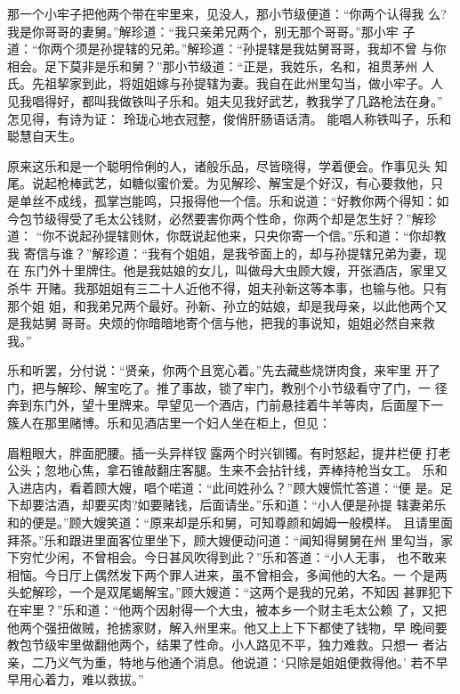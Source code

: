 那一个小牢子把他两个带在牢里来，见没人，那小节级便道：“你两个认得我
么?我是你哥哥的妻舅。”解珍道：“我只亲弟兄两个，别无那个哥哥。”那小牢
子道：“你两个须是孙提辖的兄弟。”解珍道：“孙提辖是我姑舅哥哥，我却不曾
与你相会。足下莫非是乐和舅？”那小节级道：“正是，我姓乐，名和，祖贯茅州
人氏。先祖挈家到此，将姐姐嫁与孙提辖为妻。我自在此州里勾当，做小牢子。人
见我唱得好，都叫我做铁叫子乐和。姐夫见我好武艺，教我学了几路枪法在身。”
怎见得，有诗为证：
玲珑心地衣冠整，俊俏肝肠语话清。
能唱人称铁叫子，乐和聪慧自天生。

原来这乐和是一个聪明伶俐的人，诸般乐品，尽皆晓得，学着便会。作事见头
知尾。说起枪棒武艺，如糖似蜜价爱。为见解珍、解宝是个好汉，有心要救他，只
是单丝不成线，孤掌岂能鸣，只报得他一个信。乐和说道：“好教你两个得知：如
今包节级得受了毛太公钱财，必然要害你两个性命，你两个却是怎生好？”解珍道：
“你不说起孙提辖则休，你既说起他来，只央你寄一个信。”乐和道：“你却教我
寄信与谁？”解珍道：“我有个姐姐，是我爷面上的，却与孙提辖兄弟为妻，现在
东门外十里牌住。他是我姑娘的女儿，叫做母大虫顾大嫂，开张酒店，家里又杀牛
开赌。我那姐姐有三二十人近他不得，姐夫孙新这等本事，也输与他。只有那个姐
姐，和我弟兄两个最好。孙新、孙立的姑娘，却是我母亲，以此他两个又是我姑舅
哥哥。央烦的你暗暗地寄个信与他，把我的事说知，姐姐必然自来救我。”

乐和听罢，分付说：“贤亲，你两个且宽心着。”先去藏些烧饼肉食，来牢里
开了门，把与解珍、解宝吃了。推了事故，锁了牢门，教别个小节级看守了门，一
径奔到东门外，望十里牌来。早望见一个酒店，门前悬挂着牛羊等肉，后面屋下一
簇人在那里赌博。乐和见酒店里一个妇人坐在柜上，但见：

眉粗眼大，胖面肥腰。插一头异样钗露两个时兴钏镯。有时怒起，提井栏便
打老公头；忽地心焦，拿石锥敲翻庄客腿。生来不会拈针线，弄棒持枪当女工。
乐和入进店内，看着顾大嫂，唱个喏道：“此间姓孙么？”顾大嫂慌忙答道：“便
是。足下却要沽酒，却要买肉?如要赌钱，后面请坐。”乐和道：“小人便是孙提
辖妻弟乐和的便是。”顾大嫂笑道：“原来却是乐和舅，可知尊颜和姆姆一般模样。
且请里面拜茶。”乐和跟进里面客位里坐下，顾大嫂便动问道：“闻知得舅舅在州
里勾当，家下穷忙少闲，不曾相会。今日甚风吹得到此？”乐和答道：“小人无事，
也不敢来相恼。今日厅上偶然发下两个罪人进来，虽不曾相会，多闻他的大名。一
个是两头蛇解珍，一个是双尾蝎解宝。”顾大嫂道：“这两个是我的兄弟，不知因
甚罪犯下在牢里？”乐和道：“他两个因射得一个大虫，被本乡一个财主毛太公赖
了，又把他两个强扭做贼，抢掳家财，解入州里来。他又上上下下都使了钱物，早
晚间要教包节级牢里做翻他两个，结果了性命。小人路见不平，独力难救。只想一
者沾亲，二乃义气为重，特地与他通个消息。他说道：‘只除是姐姐便救得他。’
若不早早用心着力，难以救拔。”

